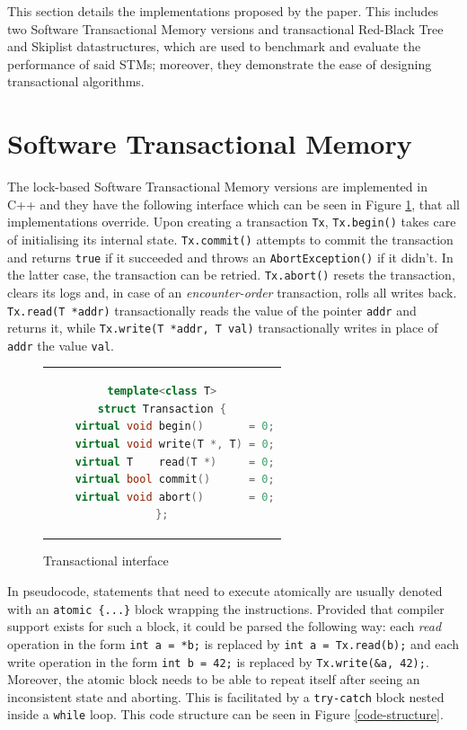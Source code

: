 This section details the implementations proposed by the paper. This includes two Software Transactional Memory versions and transactional Red-Black Tree and Skiplist datastructures, which are used to benchmark and evaluate the performance of said STMs; moreover, they demonstrate the ease of designing transactional algorithms. 

\section{Software Transactional Memory}
\label{subsec:stm_impl}

The lock-based Software Transactional Memory versions are implemented in C++ and they have the following interface which can be seen in Figure \ref{fig:interface}, that all implementations override. Upon creating a transaction \texttt{Tx}, \texttt{Tx.begin()} takes care of initialising its internal state. \texttt{Tx.commit()} attempts to commit the transaction and returns \texttt{true} if it succeeded and throws an \texttt{AbortException()} if it didn't. In the latter case, the transaction can be retried. \texttt{Tx.abort()} resets the transaction, clears its logs and, in case of an \textit{encounter-order} transaction, rolls all writes back. \texttt{Tx.read(T *addr)} transactionally reads the value of the pointer \texttt{addr} and returns it, while \texttt{Tx.write(T *addr, T val)} transactionally writes in place of \texttt{addr} the value \texttt{val}.

\begin{figure}[!htb]
\centering
\label{fig:interface}
\begin{tabular}{c}
\begin{lstlisting}[language=C++]
template<class T>
struct Transaction {
    virtual void begin()       = 0;
    virtual void write(T *, T) = 0;
    virtual T    read(T *)     = 0;
    virtual bool commit()      = 0;
    virtual void abort()       = 0;
};
\end{lstlisting}
\end{tabular}
\caption{Transactional interface}
\end{figure}

In pseudocode, statements that need to execute atomically are usually denoted with an \texttt{atomic \{...\}} block wrapping the instructions. Provided that compiler support exists for such a block, it could be parsed the following way: each \textit{read} operation in the form \texttt{int a = *b;} is replaced by \texttt{int a = Tx.read(b);} and each write operation in the form \texttt{int b = 42;} is replaced by \texttt{Tx.write(\&a, 42);}. Moreover, the atomic block needs to be able to repeat itself after seeing an inconsistent state and aborting. This is facilitated by a \texttt{try-catch} block nested inside a \texttt{while} loop. This code structure can be seen in Figure \ref{code-structure}.


